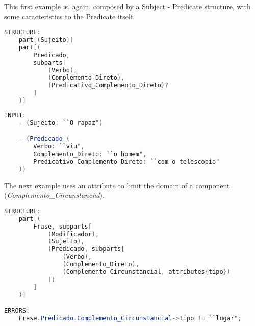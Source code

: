 This first example is, again, composed by a Subject - Predicate structure, with some caracteristics to the Predicate itself.

\begin{center}
\begin{minipage}{14cm}
\begin{lstlisting}[language=java, basicstyle=\small, label={lst:example_structure1}, caption=Example of a sentence structure]
STRUCTURE:
    part[(Sujeito)]
    part[(
        Predicado,
        subparts[
            (Verbo),
            (Complemento_Direto),
            (Predicativo_Complemento_Direto)?
        ]
    )]
\end{lstlisting}
\end{minipage}
\end{center}

\begin{center}
\begin{minipage}{14cm}
\begin{lstlisting}[language=java, basicstyle=\small, label={lst:example_input1}, caption=Example of a sentence input]
INPUT:
    - (Sujeito: ``O rapaz")

    - (Predicado (
        Verbo: ``viu",
        Complemento_Direto: ``o homem",
        Predicativo_Complemento_Direto: ``com o telescopio"
    ))
\end{lstlisting}
\end{minipage}
\end{center}


The next example uses an attribute to limit the domain of a component (\textit{Complemento\_Circunstancial}).

\begin{center}
\begin{minipage}{15cm}
\begin{lstlisting}[language=java, basicstyle=\small, label={lst:example_structure3}, caption=Example of a sentence structure]
STRUCTURE:
    part[(
        Frase, subparts[
            (Modificador),
            (Sujeito),
            (Predicado, subparts[
                (Verbo),
                (Complemento_Direto),
                (Complemento_Circunstancial, attributes{tipo})
            ])
        ]
    )]

ERRORS:
    Frase.Predicado.Complemento_Circunstancial->tipo != ``lugar";
\end{lstlisting}
\end{minipage}
\end{center}

